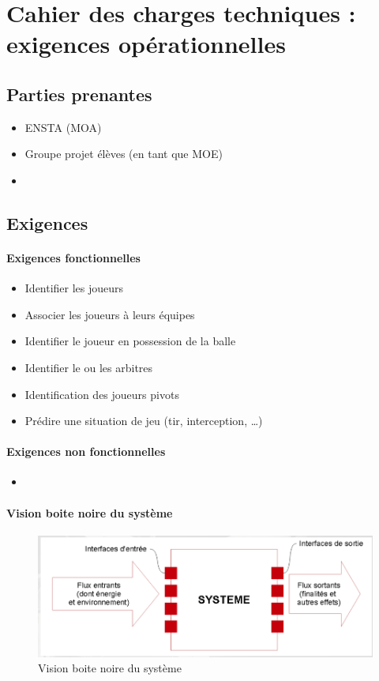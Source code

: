 \section{Cahier des charges techniques : exigences opérationnelles}
\subsection{Parties prenantes}
\begin{itemize}
    \item ENSTA (MOA)
    \item Groupe projet élèves (en tant que MOE)
    \item 
\end{itemize}
\subsection{Exigences}
\paragraph{Exigences fonctionnelles}
\begin{itemize}
    \item Identifier les joueurs 
    \item Associer les joueurs à leurs équipes 
    \item Identifier le joueur en possession de la balle 
    \item Identifier le ou les arbitres 
    \item Identification des joueurs pivots 
    \item Prédire une situation de jeu (tir, interception, \dots)
\end{itemize}
\paragraph{Exigences non fonctionnelles}
\begin{itemize}
    \item 
\end{itemize}
\paragraph{Vision boite noire du système}
\begin{figure}[!h]
    \begin{center}
        \includegraphics[scale=0.5]{images/boite_noire.png}
        \caption{Vision boite noire du système}
    \end{center}
\end{figure}
